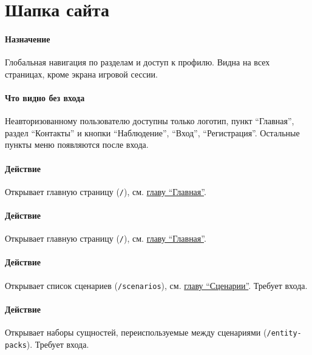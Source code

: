\section{Шапка сайта}
\label{url:header}


\paragraph{Назначение}
Глобальная навигация по разделам и доступ к профилю. Видна на всех страницах, кроме экрана игровой сессии.


\paragraph{Что видно без входа}
Неавторизованному пользователю доступны только логотип, пункт ``Главная'', раздел ``Контакты'' и кнопки ``Наблюдение'', ``Вход'', ``Регистрация''. Остальные пункты меню появляются после входа.

\paragraph{Действие}
Открывает главную страницу (\texttt{/}), см. \hyperref[url:root]{главу ``Главная''}.

\paragraph{Действие}
Открывает главную страницу (\texttt{/}), см. \hyperref[url:root]{главу ``Главная''}.

\paragraph{Действие}
Открывает список сценариев (\texttt{/scenarios}), см. \hyperref[url:scenarios]{главу ``Сценарии''}. Требует входа.

\paragraph{Действие}
Открывает наборы сущностей, переиспользуемые между сценариями (\texttt{/entity-packs}). Требует входа.

